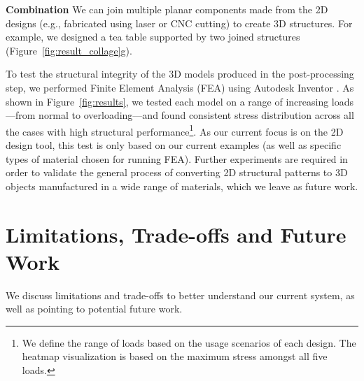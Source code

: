 
\textbf{Combination} We can join multiple planar components made from the 2D designs (e.g., fabricated using laser or CNC cutting) to create 3D structures. For example, we designed a tea table supported by two joined structures (Figure~\ref{fig:result_collage}g).




To test the structural integrity of the 3D models produced in the post-processing step, we performed Finite Element Analysis (FEA) using Autodesk Inventor \cite{AboutSha59:online}. As shown in Figure~\ref{fig:results}, we tested each model on a range of increasing loads---from normal to overloading---and found consistent stress distribution across all the cases with high structural performance\footnote{We define the range of loads based on the usage scenarios of each design. The heatmap visualization is based on the maximum stress amongst all five loads.}. As our current focus is on the 2D design tool, this test is only based on our current examples (as well as specific types of material chosen for running FEA). Further experiments are required in order to validate the general process of converting 2D structural patterns to 3D objects manufactured in a wide range of materials, which we leave as future work.

 
\section{Limitations, Trade-offs and Future Work}
We discuss limitations and trade-offs to better understand our current system, as well as pointing to potential future work.

